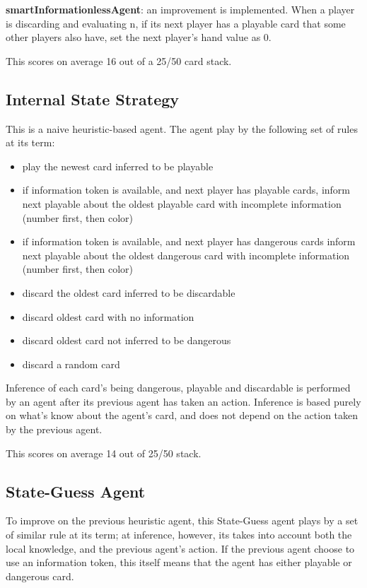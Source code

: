 \documentclass[12pt]{article}
\begin{document}
\textbf{smartInformationlessAgent}: an improvement is implemented. When a player is discarding and evaluating n, if its next player has a playable card that some other players also have, set the next player's hand value as 0. 

This scores on average 16 out of a 25/50 card stack.

\subsection{Internal State Strategy}
This is a naive heuristic-based agent. The agent play by the following set of rules at its term:
\begin{itemize}
 \item play the newest card inferred to be playable
 \item if information token is available, and next player has playable cards, inform next playable about the oldest playable card with incomplete information (number first, then color)
 \item if information token is available, and next player has dangerous cards inform next playable about the oldest dangerous card with incomplete information (number first, then color)
 \item discard the oldest card inferred to be discardable
 \item discard oldest card with no information
 \item discard oldest card not inferred to be dangerous
 \item discard a random card
\end{itemize}

Inference of each card's being dangerous, playable and discardable is performed by an agent after its previous agent has taken an action. Inference is based purely on what's know about the agent's card, and does not depend on the action taken by the previous agent.

This scores on average 14 out of 25/50 stack.

\subsection{State-Guess Agent}
To improve on the previous heuristic agent, this State-Guess agent plays by a set of similar rule at its term; at inference, however, its takes into account both the local knowledge, and the previous agent's action. If the previous agent choose to use an information token, this itself means that the agent has either playable or dangerous card.
\end{document}
